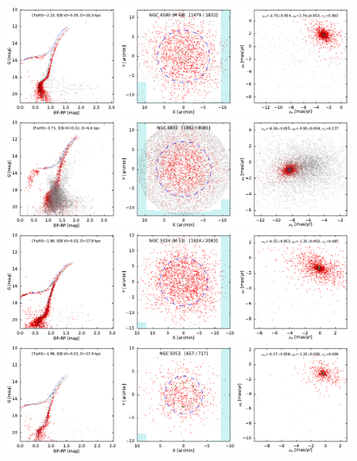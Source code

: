 \documentclass[usenatbib]{mnras}
\begin{document}
\clearpage\begin{figure}
\contcaption{}
\includegraphics{figs/NGC_4590_M_68.pdf}
\includegraphics{figs/NGC_4833.pdf}
\includegraphics{figs/NGC_5024_M_53.pdf}
\includegraphics{figs/NGC_5053.pdf}
\end{figure}
\end{document}

